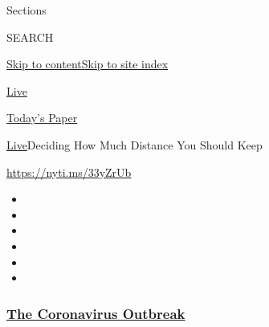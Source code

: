 Sections

SEARCH

\protect\hyperlink{site-content}{Skip to
content}\protect\hyperlink{site-index}{Skip to site index}

\href{https://www.nytimes3xbfgragh.onion/section/well/live}{Live}

\href{https://myaccount.nytimes3xbfgragh.onion/auth/login?response_type=cookie\&client_id=vi}{}

\href{https://www.nytimes3xbfgragh.onion/section/todayspaper}{Today's
Paper}

\href{/section/well/live}{Live}\textbar{}Deciding How Much Distance You
Should Keep

\url{https://nyti.ms/33yZrUb}

\begin{itemize}
\item
\item
\item
\item
\item
\item
\end{itemize}

\hypertarget{the-coronavirus-outbreak}{%
\subsubsection{\texorpdfstring{\href{https://www.nytimes3xbfgragh.onion/news-event/coronavirus?name=styln-coronavirus-national\&region=TOP_BANNER\&block=storyline_menu_recirc\&action=click\&pgtype=Article\&impression_id=4b72e2b0-efb9-11ea-b221-c1ac8458c493\&variant=undefined}{The
Coronavirus
Outbreak}}{The Coronavirus Outbreak}}\label{the-coronavirus-outbreak}}

